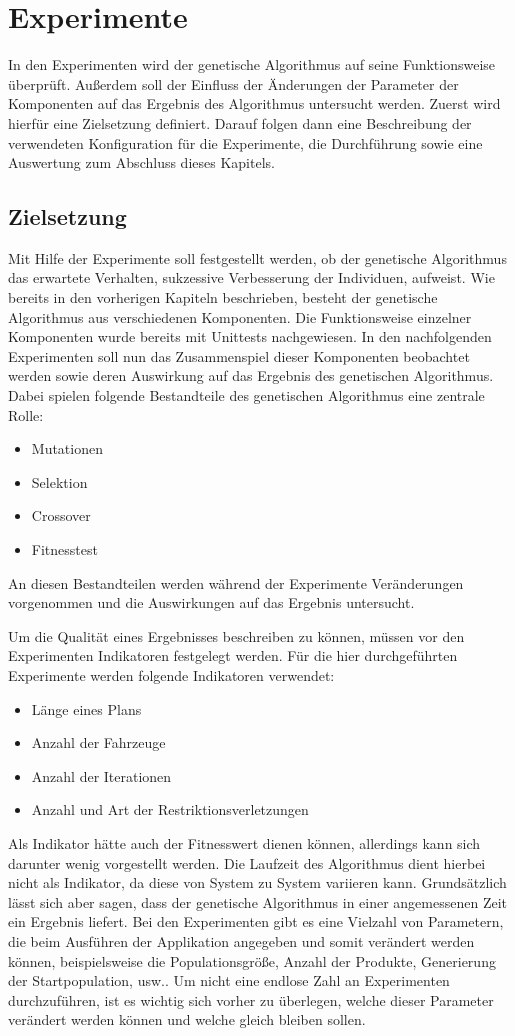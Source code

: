 \section{Experimente}
In den Experimenten wird der genetische Algorithmus auf seine Funktionsweise überprüft. Außerdem soll der Einfluss der Änderungen der Parameter der Komponenten auf das Ergebnis des Algorithmus untersucht werden. Zuerst wird hierfür eine Zielsetzung definiert. Darauf folgen dann eine Beschreibung der verwendeten Konfiguration für die Experimente, die Durchführung sowie eine Auswertung zum Abschluss dieses Kapitels.

\subsection{Zielsetzung}
\label{sec:Zielsetzung}
Mit Hilfe der Experimente soll festgestellt werden, ob der genetische Algorithmus das erwartete Verhalten, sukzessive Verbesserung der Individuen, aufweist. Wie bereits in den vorherigen Kapiteln beschrieben, besteht der genetische Algorithmus aus verschiedenen Komponenten. Die Funktionsweise einzelner Komponenten wurde bereits mit Unittests nachgewiesen. In den nachfolgenden Experimenten soll nun das Zusammenspiel dieser Komponenten beobachtet werden sowie deren Auswirkung auf das Ergebnis des genetischen Algorithmus. Dabei spielen folgende Bestandteile des genetischen Algorithmus eine zentrale Rolle:
\begin{itemize}
 \item Mutationen
 \item Selektion
 \item Crossover
 \item Fitnesstest
\end{itemize}
An diesen Bestandteilen werden während der Experimente Veränderungen vorgenommen und die Auswirkungen auf das Ergebnis untersucht.

Um die Qualität eines Ergebnisses beschreiben zu können, müssen vor den Experimenten Indikatoren festgelegt werden. Für die hier durchgeführten Experimente werden folgende Indikatoren verwendet:
\begin{itemize}
 \item Länge eines Plans
 \item Anzahl der Fahrzeuge
 \item Anzahl der Iterationen
 \item Anzahl und Art der Restriktionsverletzungen
\end{itemize}
Als Indikator hätte auch der Fitnesswert dienen können, allerdings kann sich darunter wenig vorgestellt werden. Die Laufzeit des Algorithmus dient hierbei nicht als Indikator, da diese von System zu System variieren kann. Grundsätzlich lässt sich aber sagen, dass der genetische Algorithmus in einer angemessenen Zeit ein Ergebnis liefert.
Bei den Experimenten gibt es eine Vielzahl von Parametern, die beim Ausführen der Applikation angegeben und somit verändert werden können, beispielsweise die Populationsgröße, Anzahl der Produkte, Generierung der Startpopulation, usw.. Um nicht eine endlose Zahl an Experimenten durchzuführen, ist es wichtig sich vorher zu überlegen, welche dieser Parameter verändert werden können und welche gleich bleiben sollen.

